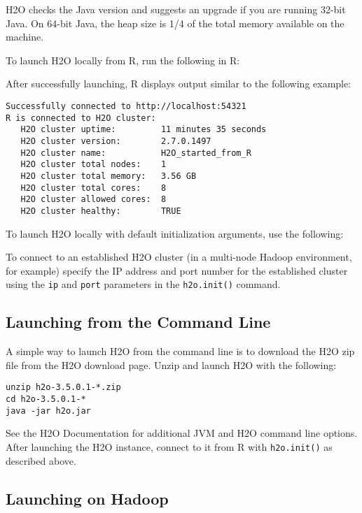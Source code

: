 {{H2O checks the Java version and suggests an upgrade if you are running 32-bit Java. On 64-bit Java, the heap size is 1/4 of the total memory available on the machine.

To launch H2O locally from R, run the following in R:



After successfully launching, R displays output similar to the following example:
\begin{lstlisting}[style=R]
Successfully connected to http://localhost:54321
R is connected to H2O cluster:
   H2O cluster uptime:         11 minutes 35 seconds
   H2O cluster version:        2.7.0.1497
   H2O cluster name:           H2O_started_from_R
   H2O cluster total nodes:    1
   H2O cluster total memory:   3.56 GB
   H2O cluster total cores:    8
   H2O cluster allowed cores:  8
   H2O cluster healthy:        TRUE
\end{lstlisting}


To launch H2O locally with default initialization arguments, use the following:

\waterExampleInR
\medskip


\newpage

To connect to an established H2O cluster (in a multi-node Hadoop environment, for example) specify the IP address and port number for the established cluster using the \texttt{ip} and \texttt{port} parameters in the \texttt{h2o.init()} command.

\waterExampleInR
\medskip


\subsection{Launching from the Command Line}

A simple way to launch H2O from the command line is to download the H2O zip file from the H2O download page. Unzip and
launch H2O with the following:
\begin{lstlisting}[style=R]
unzip h2o-3.5.0.1-*.zip
cd h2o-3.5.0.1-*
java -jar h2o.jar
\end{lstlisting}
See the H2O Documentation for additional JVM and H2O command line options.
After launching the H2O instance, connect to it from R with {\texttt{h2o.init()}} as described above.

\subsection{Launching on Hadoop}

}}
